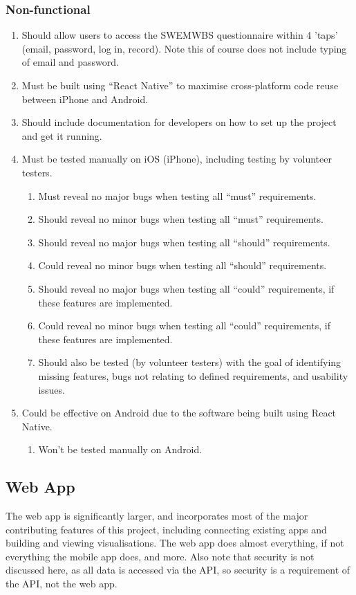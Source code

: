 \documentclass[11pt,openright,a4paper]{report}
\begin{document}
\subsubsection{Non-functional}
\begin{enumerate}
\item Should allow users to access the SWEMWBS questionnaire within 4 'taps' (email, password, log in, record). Note this of course does not include typing of email and password.
\item Must be built using \enquote{React Native} \parencite{reactnative} \parencite{reactnativegit} to maximise cross-platform code reuse between iPhone and Android.
\item Should include documentation for developers on how to set up the project and get it running.
\item Must be tested manually on iOS (iPhone), including testing by volunteer testers.
  \begin{enumerate}
  \item Must reveal no major bugs when testing all \enquote{must} requirements.
  \item Should reveal no minor bugs when testing all \enquote{must} requirements.
  \item Should reveal no major bugs when testing all \enquote{should} requirements.
  \item Could reveal no minor bugs when testing all \enquote{should} requirements.
  \item Should reveal no major bugs when testing all \enquote{could} requirements, if these features are implemented.
  \item Could reveal no minor bugs when testing all \enquote{could} requirements, if these features are implemented.
  \item Should also be tested (by volunteer testers) with the goal of identifying missing features, bugs not relating to defined requirements, and usability issues.
  \end{enumerate}
\item Could be effective on Android due to the software being built using React Native.
  \begin{enumerate}
  \item Won't be tested manually on Android.
  \end{enumerate}
\end{enumerate}

\subsection{Web App}
The web app is significantly larger, and incorporates most of the major contributing features of this project, including connecting existing apps and building and viewing visualisations. The web app does almost everything, if not everything the mobile app does, and more. Also note that security is not discussed here, as all data is accessed via the API, so security is a requirement of the API, not the web app.
\end{document}
